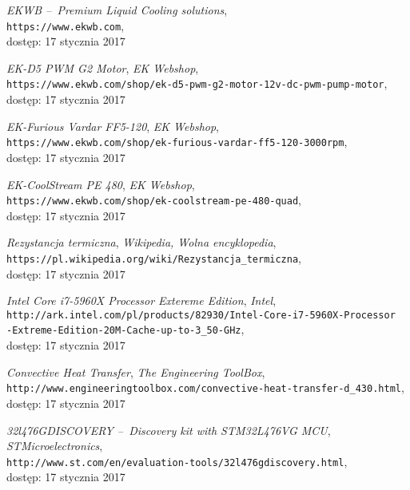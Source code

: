 \begin{thebibliography}{9}

        \textit{EKWB --~Premium Liquid Cooling solutions},\\
        \verb+https://www.ekwb.com+,\\
        dostęp: 17 stycznia 2017
        
        \textit{EK-D5 PWM G2 Motor},
        \textit{EK Webshop},\\
        \verb+https://www.ekwb.com/shop/ek-d5-pwm-g2-motor-12v-dc-pwm-pump-motor+,\\
        dostęp: 17 stycznia 2017
        
        \textit{EK-Furious Vardar FF5-120},
        \textit{EK Webshop},\\
        \verb+https://www.ekwb.com/shop/ek-furious-vardar-ff5-120-3000rpm+,\\
        dostęp: 17 stycznia 2017
    
        \textit{EK-CoolStream PE 480},
        \textit{EK Webshop},\\
        \verb+https://www.ekwb.com/shop/ek-coolstream-pe-480-quad+,\\
        dostęp: 17 stycznia 2017
        
        \textit{Rezystancja termiczna},
        \textit{Wikipedia, Wolna encyklopedia},\\
        \verb+https://pl.wikipedia.org/wiki/Rezystancja_termiczna+,\\
        dostęp: 17 stycznia 2017
        
        \textit{Intel Core i7-5960X Processor Extereme Edition},
        \textit{Intel},\\
        \verb+http://ark.intel.com/pl/products/82930/Intel-Core-i7-5960X-Processor+\\
        \verb+-Extreme-Edition-20M-Cache-up-to-3_50-GHz+,\\
        dostęp: 17 stycznia 2017
        
        \textit{Convective Heat Transfer},
        \textit{The Engineering ToolBox},\\
        \verb+http://www.engineeringtoolbox.com/convective-heat-transfer-d_430.html+,\\
        dostęp: 17 stycznia 2017
        
        \textit{32l476GDISCOVERY --~Discovery kit with STM32L476VG MCU},
        \textit{STMicroelectronics},\\
        \verb+http://www.st.com/en/evaluation-tools/32l476gdiscovery.html+,\\
        dostęp: 17 stycznia 2017

\end{thebibliography}
